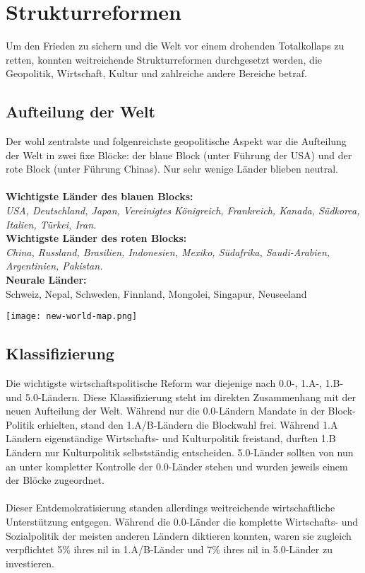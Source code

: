 \section{Strukturreformen} 
Um den Frieden zu sichern und die Welt vor einem drohenden Totalkollaps zu
retten, konnten weitreichende Strukturreformen durchgesetzt werden, die
Geopolitik, Wirtschaft, Kultur und zahlreiche andere Bereiche betraf. 

\subsection{Aufteilung der Welt} 
Der wohl zentralste und folgenreichste geopolitische Aspekt war die Aufteilung
der Welt in zwei fixe Blöcke: der blaue Block (unter Führung der USA) und der
rote Block (unter Führung Chinas). Nur sehr wenige Länder blieben neutral.\\\\
%
\textbf{Wichtigste Länder des blauen Blocks:}\\
\emph{USA, Deutschland, Japan, Vereinigtes Königreich, Frankreich, Kanada, Südkorea,
Italien, Türkei, Iran.}\\
\textbf{Wichtigste Länder des roten Blocks:}\\
\emph{China, Russland, Brasilien, Indonesien, Mexiko, Südafrika, Saudi-Arabien,
Argentinien, Pakistan.}\\
\textbf{Neurale Länder:}\\ 
Schweiz, Nepal, Schweden, Finnland, Mongolei, Singapur, Neuseeland

\begin{center}
  \texttt{[image: new-world-map.png]}%
\end{center}


\subsection{Klassifizierung}
Die wichtigste wirtschaftspolitische Reform war diejenige nach 0.0-, 1.A-, 1.B-
und 5.0-Ländern.
Diese Klassifizierung steht im direkten Zusammenhang mit der neuen Aufteilung
der Welt. 
Während nur die 0.0-Ländern Mandate in der Block-Politik erhielten, stand den
1.A/B-Ländern die Blockwahl frei. Während 1.A Ländern eigenständige
Wirtschafts- und Kulturpolitik freistand, durften 1.B Ländern nur Kulturpolitik
selbstständig entscheiden. 5.0-Länder sollten von nun an unter kompletter
Kontrolle der 0.0-Länder stehen und wurden jeweils einem der Blöcke
zugeordnet.\\\\
% 
Dieser Entdemokratisierung standen allerdings weitreichende wirtschaftliche
Unterstützung entgegen. Während die 0.0-Länder die komplette Wirtschafts- und
Sozialpolitik der meisten anderen Ländern diktieren konnten, waren sie zugleich
verpflichtet 5\% ihres \ac{nil} in 1.A/B-Länder und 7\% ihres \ac{nil} in
5.0-Länder zu investieren. 

